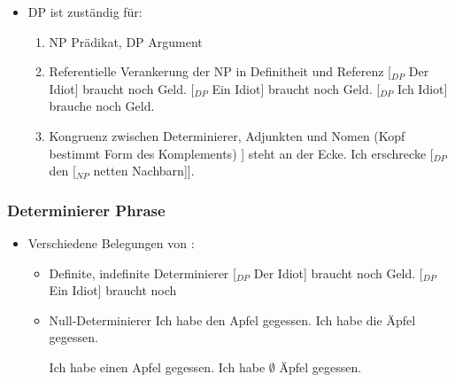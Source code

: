 \begin{frame}

\begin{itemize}
\item DP ist zuständig für:
		\begin{enumerate}
			\item NP \ras Prädikat, DP \ras Argument 
			\eal 
			\zl
			
			\item Referentielle Verankerung der NP in Definitheit und Referenz
			\eal
			\ex \alert{[$_{DP}$ Der Idiot]} braucht noch Geld.
			\ex \alert{[$_{DP}$ Ein Idiot]} braucht noch Geld.
			\ex \alert{[$_{DP}$ Ich Idiot]} brauche noch Geld.
			\zl

			\item Kongruenz zwischen Determinierer, Adjunkten und Nomen (Kopf bestimmt Form des Komplements)
			\eal 
			\ex [$_{DP}$ Der [$_{NP}$ \alert{nette Nachbar}]] steht an der Ecke.
			\ex Ich erschrecke [$_{DP}$ den [$_{NP}$ \alert{netten Nachbarn}]].
			\zl

		\end{enumerate}		
	
	\end{itemize}			

\end{frame}


\begin{frame}
\frametitle{Determinierer Phrase}

\begin{itemize}
	\item Verschiedene Belegungen von :
	\begin{itemize}
		\item Definite, indefinite Determinierer
		\eal
		\ex \alert{[$_{DP}$ Der Idiot]} braucht noch Geld.
		\ex \alert{[$_{DP}$ Ein Idiot]} braucht noch 
		\zl

\pause		
		\item Null-Determinierer 
		\eal 
		\ex Ich habe \alert{den Apfel} gegessen.
		\ex Ich habe \alert{die Äpfel} gegessen.
		\zl			

\pause		
		\eal
		\ex Ich habe \alert{einen Apfel} gegessen.
		\ex Ich habe \alert{$\emptyset$ Äpfel} gegessen.
		\zl			
		
	\end{itemize}
\end{itemize}

\end{frame}


